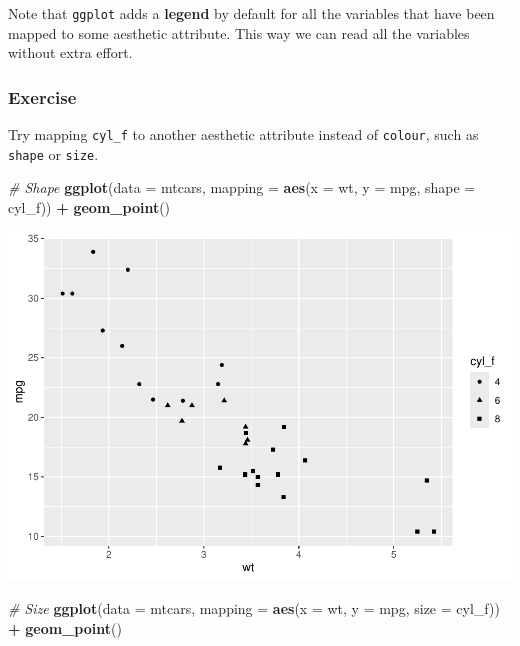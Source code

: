 \documentclass[
]{article}
\newenvironment{Shaded}{\begin{snugshade}}{\end{snugshade}}
\newcommand{\AttributeTok}[1]{\textcolor[rgb]{0.13,0.29,0.53}{#1}}
\newcommand{\CommentTok}[1]{\textcolor[rgb]{0.56,0.35,0.01}{\textit{#1}}}
\newcommand{\FunctionTok}[1]{\textcolor[rgb]{0.13,0.29,0.53}{\textbf{#1}}}
\newcommand{\NormalTok}[1]{#1}
\newcommand{\SpecialCharTok}[1]{\textcolor[rgb]{0.81,0.36,0.00}{\textbf{#1}}}
\begin{document}
Note that \texttt{ggplot} adds a \textbf{legend} by default for all the
variables that have been mapped to some aesthetic attribute. This way we
can read all the variables without extra effort.

\subsubsection{\texorpdfstring{ Exercise}{ Exercise}}\label{exercise}

Try mapping \texttt{cyl\_f} to another aesthetic attribute instead of
\texttt{colour}, such as \texttt{shape} or \texttt{size}.

\begin{Shaded}
\begin{Highlighting}[]
\CommentTok{\# Shape}
\FunctionTok{ggplot}\NormalTok{(}\AttributeTok{data =}\NormalTok{ mtcars, }\AttributeTok{mapping =} \FunctionTok{aes}\NormalTok{(}\AttributeTok{x =}\NormalTok{ wt, }\AttributeTok{y =}\NormalTok{ mpg, }\AttributeTok{shape =}\NormalTok{ cyl\_f)) }\SpecialCharTok{+} 
  \FunctionTok{geom\_point}\NormalTok{()}
\end{Highlighting}
\end{Shaded}

\begin{center}\includegraphics{P1_exercises_files/figure-latex/answer1.1-1} \end{center}

\begin{Shaded}
\begin{Highlighting}[]
\CommentTok{\# Size}
\FunctionTok{ggplot}\NormalTok{(}\AttributeTok{data =}\NormalTok{ mtcars, }\AttributeTok{mapping =} \FunctionTok{aes}\NormalTok{(}\AttributeTok{x =}\NormalTok{ wt, }\AttributeTok{y =}\NormalTok{ mpg, }\AttributeTok{size =}\NormalTok{ cyl\_f)) }\SpecialCharTok{+} 
  \FunctionTok{geom\_point}\NormalTok{()}
\end{Highlighting}
\end{Shaded}
\end{document}
